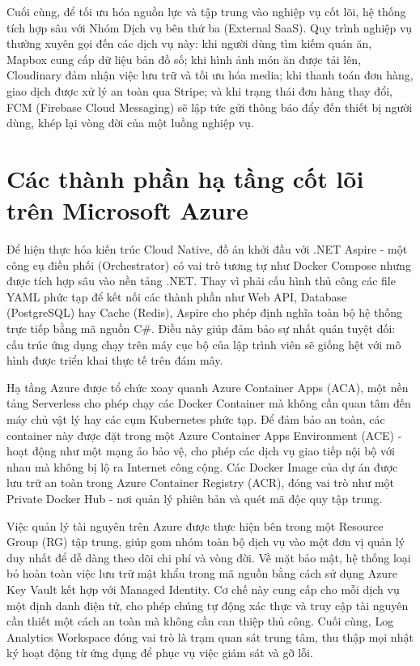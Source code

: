 \documentclass[a4paper,12pt,twoside]{report}
\begin{document}
Cuối cùng, để tối ưu hóa nguồn lực và tập trung vào nghiệp vụ cốt lõi, hệ thống tích hợp sâu với Nhóm Dịch vụ bên thứ ba (External SaaS). Quy trình nghiệp vụ thường xuyên gọi đến các dịch vụ này: khi người dùng tìm kiếm quán ăn, Mapbox cung cấp dữ liệu bản đồ số; khi hình ảnh món ăn được tải lên, Cloudinary đảm nhận việc lưu trữ và tối ưu hóa media; khi thanh toán đơn hàng, giao dịch được xử lý an toàn qua Stripe; và khi trạng thái đơn hàng thay đổi, FCM (Firebase Cloud Messaging) sẽ lập tức gửi thông báo đẩy đến thiết bị người dùng, khép lại vòng đời của một luồng nghiệp vụ.

\section{Các thành phần hạ tầng cốt lõi trên Microsoft Azure}

Để hiện thực hóa kiến trúc Cloud Native, đồ án khởi đầu với .NET Aspire - một công cụ điều phối (Orchestrator) có vai trò tương tự như Docker Compose nhưng được tích hợp sâu vào nền tảng .NET. Thay vì phải cấu hình thủ công các file YAML phức tạp để kết nối các thành phần như Web API, Database (PostgreSQL) hay Cache (Redis), Aspire cho phép định nghĩa toàn bộ hệ thống trực tiếp bằng mã nguồn C\#. Điều này giúp đảm bảo sự nhất quán tuyệt đối: cấu trúc ứng dụng chạy trên máy cục bộ của lập trình viên sẽ giống hệt với mô hình được triển khai thực tế trên đám mây.

Hạ tầng Azure được tổ chức xoay quanh Azure Container Apps (ACA), một nền tảng Serverless cho phép chạy các Docker Container mà không cần quan tâm đến máy chủ vật lý hay các cụm Kubernetes phức tạp. Để đảm bảo an toàn, các container này được đặt trong một Azure Container Apps Environment (ACE) - hoạt động như một mạng ảo bảo vệ, cho phép các dịch vụ giao tiếp nội bộ với nhau mà không bị lộ ra Internet công cộng. Các Docker Image của dự án được lưu trữ an toàn trong Azure Container Registry (ACR), đóng vai trò như một Private Docker Hub - nơi quản lý phiên bản và quét mã độc quy tập trung.

Việc quản lý tài nguyên trên Azure được thực hiện bên trong một Resource Group (RG) tập trung, giúp gom nhóm toàn bộ dịch vụ vào một đơn vị quản lý duy nhất để dễ dàng theo dõi chi phí và vòng đời. Về mặt bảo mật, hệ thống loại bỏ hoàn toàn việc lưu trữ mật khẩu trong mã nguồn bằng cách sử dụng Azure Key Vault kết hợp với Managed Identity. Cơ chế này cung cấp cho mỗi dịch vụ một định danh điện tử, cho phép chúng tự động xác thực và truy cập tài nguyên cần thiết một cách an toàn mà không cần can thiệp thủ công. Cuối cùng, Log Analytics Workspace đóng vai trò là trạm quan sát trung tâm, thu thập mọi nhật ký hoạt động từ ứng dụng để phục vụ việc giám sát và gỡ lỗi.
\end{document}
